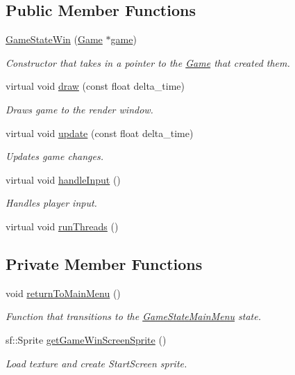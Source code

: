 \subsection*{Public Member Functions}
\begin{DoxyCompactItemize}
\item 
\hyperlink{class_game_state_win_ab5d68ee7ee370d0307f4a128c6f69db1}{Game\+State\+Win} (\hyperlink{class_game}{Game} $\ast$\hyperlink{class_game_state_a355a79415b9ef63c2aec1448a99f6e71}{game})
\begin{DoxyCompactList}\small\item\em Constructor that takes in a pointer to the \hyperlink{class_game}{Game} that created them. \end{DoxyCompactList}\item 
virtual void \hyperlink{class_game_state_win_aa5d3bc751d492439016f8d42fce2110a}{draw} (const float delta\+\_\+time)
\begin{DoxyCompactList}\small\item\em Draws game to the render window. \end{DoxyCompactList}\item 
virtual void \hyperlink{class_game_state_win_ae8f665d71817f632afc55a665573ca8e}{update} (const float delta\+\_\+time)
\begin{DoxyCompactList}\small\item\em Updates game changes. \end{DoxyCompactList}\item 
virtual void \hyperlink{class_game_state_win_a6a40673e81af38639e4191c0ec2f4048}{handle\+Input} ()
\begin{DoxyCompactList}\small\item\em Handles player input. \end{DoxyCompactList}\item 
virtual void \hyperlink{class_game_state_win_a83539ca4b809a5635d30500fa5813d1e}{run\+Threads} ()
\end{DoxyCompactItemize}
\subsection*{Private Member Functions}
\begin{DoxyCompactItemize}
\item 
void \hyperlink{class_game_state_win_a412ddc8fae7d78c8fbcd7431da080625}{return\+To\+Main\+Menu} ()
\begin{DoxyCompactList}\small\item\em Function that transitions to the \hyperlink{class_game_state_main_menu}{Game\+State\+Main\+Menu} state. \end{DoxyCompactList}\item 
sf\+::\+Sprite \hyperlink{class_game_state_win_ac132224bbd5fc1aa35e5940c49f33cdc}{get\+Game\+Win\+Screen\+Sprite} ()
\begin{DoxyCompactList}\small\item\em Load texture and create Start\+Screen sprite. \end{DoxyCompactList}\end{DoxyCompactItemize}
